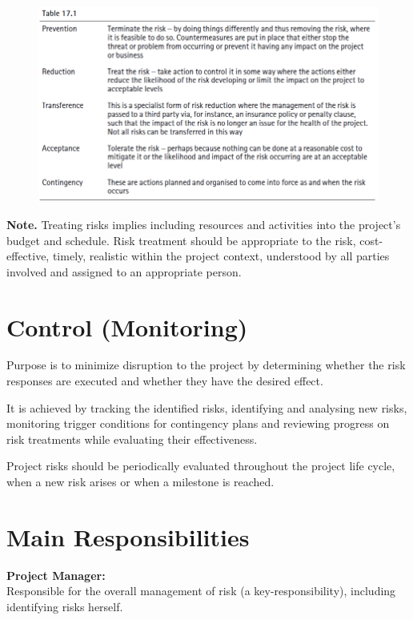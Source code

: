 \documentclass[]{project_plan}
\begin{document}
\begin{figure}[h!]
  \centering
  \includegraphics[width=40em]{risk_actions.png}
\end{figure}

\textbf{Note.} Treating risks implies including resources and activities into the
project’s budget and schedule. Risk treatment should be appropriate to the
risk, cost-effective, timely, realistic within the project context, understood
by all parties involved and assigned to an appropriate person.

\section{Control (Monitoring)}
Purpose is to minimize disruption to the project by determining whether the risk
responses are executed and whether they have the desired effect.

It is achieved by tracking the identified risks, identifying and analysing new risks,
monitoring trigger conditions for contingency plans and reviewing progress on risk
treatments while evaluating their effectiveness.

Project risks should be periodically evaluated throughout the project life cycle, when a
new risk arises or when a milestone is reached.

\newpage

\section{Main Responsibilities}

\textbf{Project Manager:}\\
Responsible for the overall management of risk (a key-responsibility), including identifying risks herself.
\end{document}
